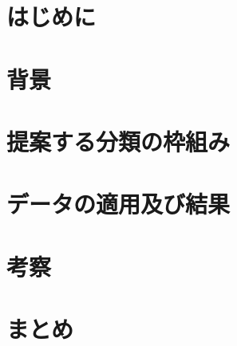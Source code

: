 \documentclass[paper]{ieicej}
\begin{document}
\begin{abstract}


\end{abstract}
\begin{keyword}
\end{keyword}
\begin{eabstract}

%

\end{eabstract}
\begin{ekeyword}
\end{ekeyword}
\maketitle

\section{はじめに}

\section{背景}

\section{提案する分類の枠組み}

\section{データの適用及び結果}

\section{考察}

\section{まとめ}



\ack %








\appendix

\section{}

\begin{biography}
\profile{}{}{}
\end{biography}
\end{document}
